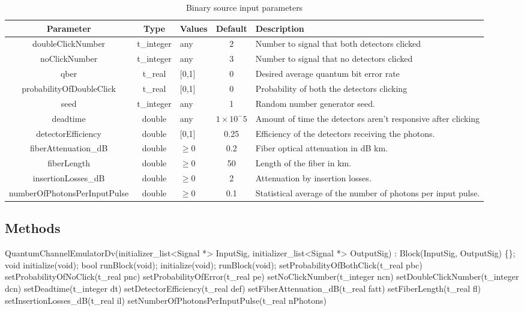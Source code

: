 \begin{table}[h]
	\centering
	\begin{tabular}{|c|c|p{20mm}|c|p{35mm}|}
		\hline
		\textbf{Parameter} & \textbf{Type} & \textbf{Values} & \textbf{Default}& \textbf{Description} \\ \hline
		doubleClickNumber & t\_integer & any &  2 & Number to signal that
		both detectors clicked \\\hline
		noClickNumber & t\_integer & any &  3 & Number to signal that
		no detectors clicked \\\hline
		qber & t\_real & [0,1] &  0 & Desired average quantum bit error rate \\\hline
		probabilityOfDoubleClick & t\_real & [0,1] &  0 & Probability of
		both the detectors clicking\\\hline
		seed & t\_integer & any & 1 & Random number generator seed.\\\hline
		deadtime & double & any & $1\times10^-5$ & Amount of time the detectors
		aren't responsive after clicking\\\hline
		detectorEfficiency & double & [0,1] & 0.25 & Efficiency of the detectors
		receiving the photons. \\\hline
		fiberAttenuation\_dB & double & $\geq 0$ & 0.2 & Fiber optical
		attenuation in dB \/ km. \\\hline
		fiberLength & double & $\geq 0$ & 50 & Length of the fiber in km. \\\hline
		insertionLosses\_dB & double & $\geq 0$ & 2 & Attenuation by insertion losses. \\\hline
		numberOfPhotonsPerInputPulse & double & $\geq 0$ & 0.1 & Statistical
		average of the number of photons per input pulse. \\\hline
	\end{tabular}
	\caption{Binary source input parameters}
	\label{table:bin_sour_in_par}
\end{table}

\subsection*{Methods}

QuantumChannelEmulatorDv(initializer\_list<Signal *> InputSig, initializer\_list<Signal *> OutputSig) : Block(InputSig, OutputSig) \{\};
\bigbreak	
void initialize(void);
\bigbreak	
bool runBlock(void);
\bigbreak
initialize(void);
\bigbreak
runBlock(void);
\bigbreak
setProbabilityOfBothClick(t\_real pbc)
\bigbreak
setProbabilityOfNoClick(t\_real pnc)
\bigbreak
setProbabilityOfError(t\_real pe)
\bigbreak
setNoClickNumber(t\_integer ncn)
\bigbreak
setDoubleClickNumber(t\_integer dcn)
\bigbreak
setDeadtime(t\_integer dt)
\bigbreak
setDetectorEfficiency(t\_real def)
\bigbreak
setFiberAttenuation\_dB(t\_real fatt)
\bigbreak
setFiberLength(t\_real fl)
\bigbreak
setInsertionLosses\_dB(t\_real il)
\bigbreak
setNumberOfPhotonsPerInputPulse(t\_real nPhotons)
\bigbreak

